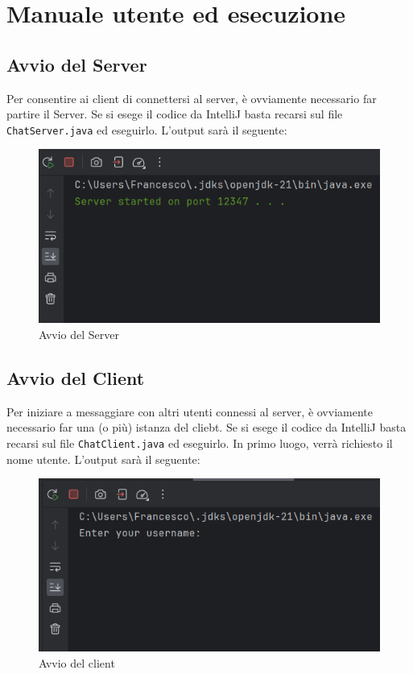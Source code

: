 \section{Manuale utente ed esecuzione}

\subsection{Avvio del Server}
Per consentire ai client di connettersi al server, è ovviamente necessario far partire il Server. Se si esege il codice da IntelliJ basta recarsi sul file \texttt{ChatServer.java} ed eseguirlo. L'output sarà il seguente: 
\begin{figure}[h]
  \centering
  \begin{minipage}{0.45\textwidth}
    \includegraphics[width=\linewidth]{imagens/outputs/1.png}
    \caption{Avvio del Server}
  \end{minipage}\hfill
\end{figure}

\subsection{Avvio del Client}
Per iniziare a messaggiare con altri utenti connessi al server, è ovviamente necessario far una (o più) istanza del cliebt. Se si esege il codice da IntelliJ basta recarsi sul file \texttt{ChatClient.java} ed eseguirlo. In primo luogo, verrà richiesto il nome utente. L'output sarà il seguente: 
\begin{figure}[h]
  \centering
  \begin{minipage}{0.45\textwidth}
    \includegraphics[width=\linewidth]{imagens/outputs/1_2.png}
    \caption{Avvio del client}
  \end{minipage}\hfill
\end{figure}
\newpage

